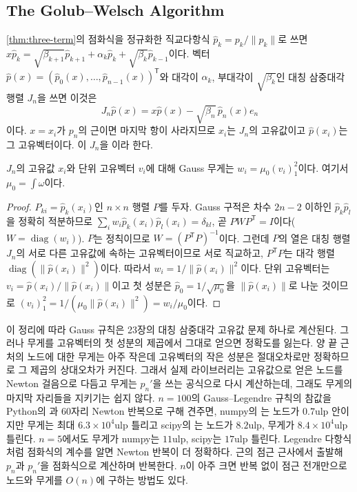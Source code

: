\subsection{The Golub--Welsch Algorithm}

\cref{thm:three-term}의 점화식을 정규화한 직교다항식 $\hat p_k=p_k/\|p_k\|$로 쓰면 $x\hat p_k=\sqrt{\beta_{k+1}}\hat p_{k+1}+\alpha_k\hat p_k+\sqrt{\beta_k}\hat p_{k-1}$이다. 벡터 $\hat p(x)=(\hat p_0(x),\dots,\hat p_{n-1}(x))^{\mathsf T}$와 대각이 $\alpha_k$, 부대각이 $\sqrt{\beta_k}$인 대칭 삼중대각 행렬 $J_n$을 쓰면 이것은
\[
J_n\hat p(x)=x\hat p(x)-\sqrt{\beta_n}\,\hat p_n(x)e_n
\]
이다. $x=x_i$가 $p_n$의 근이면 마지막 항이 사라지므로 $x_i$는 $J_n$의 고유값이고 $\hat p(x_i)$는 그 고유벡터이다. 이 $J_n$을 이라 한다.

\begin{proposition}
\label{prop:golub-welsch}
$J_n$의 고유값 $x_i$와 단위 고유벡터 $v_i$에 대해 Gauss 무게는 $w_i=\mu_0(v_i)_1^2$이다. 여기서 $\mu_0=\int\omega$이다.
\end{proposition}

\begin{proof}
$P_{ki}=\hat p_k(x_i)$인 $n\times n$ 행렬 $P$를 두자. Gauss 구적은 차수 $2n-2$ 이하인 $\hat p_k\hat p_l$을 정확히 적분하므로 $\sum_iw_i\hat p_k(x_i)\hat p_l(x_i)=\delta_{kl}$, 곧 $PWP^{\mathsf T}=I$이다($W=\operatorname{diag}(w_i)$). $P$는 정칙이므로 $W=(P^{\mathsf T}P)^{-1}$이다. 그런데 $P$의 열은 대칭 행렬 $J_n$의 서로 다른 고유값에 속하는 고유벡터이므로 서로 직교하고, $P^{\mathsf T}P$는 대각 행렬 $\operatorname{diag}(\|\hat p(x_i)\|^2)$이다. 따라서 $w_i=1/\|\hat p(x_i)\|^2$이다. 단위 고유벡터는 $v_i=\hat p(x_i)/\|\hat p(x_i)\|$이고 첫 성분은 $\hat p_0=1/\sqrt{\mu_0}$을 $\|\hat p(x_i)\|$로 나눈 것이므로 $(v_i)_1^2=1/(\mu_0\|\hat p(x_i)\|^2)=w_i/\mu_0$이다.
\end{proof}

이 정리에 따라 Gauss 규칙은 23장의 대칭 삼중대각 고유값 문제 하나로 계산된다\cite{golub1969welsch}. 그러나 무게를 고유벡터의 첫 성분의 제곱에서 그대로 얻으면 정확도를 잃는다. 양 끝 근처의 노드에 대한 무게는 아주 작은데 고유벡터의 작은 성분은 절대오차로만 정확하므로 그 제곱의 상대오차가 커진다. 그래서 실제 라이브러리는 고유값으로 얻은 노드를 Newton 걸음으로 다듬고 무게는 $p_n'$을 쓰는 공식으로 다시 계산하는데, 그래도 무게의 마지막 자리들을 지키기는 쉽지 않다. $n=100$의 Gauss--Legendre 규칙의 참값을 Python의 과 $60$자리 Newton 반복으로 구해 견주면, numpy의 는 노드가 $0.7$ulp 안이지만 무게는 최대 $6.3\times10^4$ulp 틀리고 scipy의 는 노드가 $8.2$ulp, 무게가 $8.4\times10^4$ulp 틀린다. $n=5$에서도 무게가 numpy는 $11$ulp, scipy는 $17$ulp 틀린다. Legendre 다항식처럼 점화식의 계수를 알면 Newton 반복이 더 정확하다. 근의 점근 근사에서 출발해 $p_n$과 $p_n'$을 점화식으로 계산하며 반복한다. $n$이 아주 크면 반복 없이 점근 전개만으로 노드와 무게를 $O(n)$에 구하는 방법도 있다\cite{hale2013legendre,bogaert2014}.

